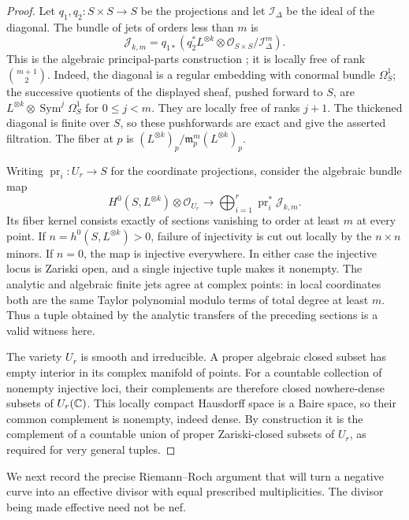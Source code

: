\begin{proof}
Let $q_1,q_2:S\times S\to S$ be the projections and let
$\mathcal I_\Delta$ be the ideal of the diagonal. The bundle of jets
of orders less than $m$ is
\[
 \mathcal J_{k,m}
 =q_{1*}\!\left(q_2^*L^{\otimes k}\otimes
       \mathcal O_{S\times S}/\mathcal I_\Delta^m\right).
\]
This is the algebraic principal-parts construction
\cite[Tags 0G3P and 0638]{Stacks}; it is locally free of rank
$\binom{m+1}{2}$.
Indeed, the diagonal is a regular embedding with conormal bundle
$\Omega_S^1$; the successive quotients of the displayed sheaf, pushed
forward to $S$, are
$L^{\otimes k}\otimes\operatorname{Sym}^j\Omega_S^1$ for
$0\le j<m$. They are locally free of ranks $j+1$.
The thickened diagonal is finite over $S$, so these pushforwards are
exact and give the asserted filtration. The fiber at $p$ is
$(L^{\otimes k})_p/\mathfrak m_p^m(L^{\otimes k})_p$.

Writing $\operatorname{pr}_i:U_r\to S$ for the coordinate projections,
consider the algebraic bundle map
\[
 H^0(S,L^{\otimes k})\otimes\mathcal O_{U_r}
 \longrightarrow\bigoplus_{i=1}^r\operatorname{pr}_i^*\mathcal J_{k,m}.
\]
Its fiber kernel consists exactly of sections vanishing to order at
least $m$ at every point. If $n=h^0(S,L^{\otimes k})>0$, failure of
injectivity is cut out locally by the $n\times n$ minors. If $n=0$,
the map is injective everywhere. In either case the injective locus
is Zariski open, and a single injective tuple makes it nonempty.
The analytic and algebraic finite jets agree at complex points:
in local coordinates both are the same Taylor polynomial modulo terms
of total degree at least $m$. Thus a tuple obtained by the analytic
transfers of the preceding sections is a valid witness here.

The variety $U_r$ is smooth and irreducible. A proper algebraic closed
subset has empty interior in its complex manifold of points. For a
countable collection of nonempty injective loci, their complements are
therefore closed nowhere-dense subsets of $U_r(\mathbb C)$. This locally
compact Hausdorff space is a Baire space, so their common complement
is nonempty, indeed dense. By construction it is the complement of a
countable union of proper Zariski-closed subsets of $U_r$, as required
for very general tuples.
\end{proof}

We next record the precise Riemann--Roch argument that will turn a
negative curve into an effective divisor with equal prescribed
multiplicities. The divisor being made effective need not be nef.

